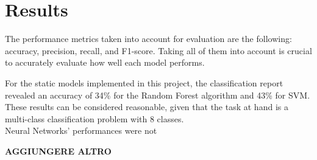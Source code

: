 \chapter*{Results}
\label{ch:results}
The performance metrics taken into account for evaluation are the following:
accuracy, precision, recall, and F1-score. Taking all of them into account
is crucial to accurately evaluate how well each model performs.

For the static models implemented in this project, the classification report
revealed an accuracy of 34\% for the Random Forest algorithm and 43\% for SVM. 
These results can be considered reasonable, given that the task at hand is a
multi-class classification problem with 8 classes.\\

Neural Networks' performances were not 

\textbf{AGGIUNGERE ALTRO}